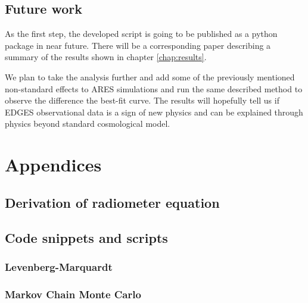 \documentclass[12pt, TexShade, letterpaper]{report}
\begin{document}
\section{Future work}
As the first step, the developed script is going to be published as a python package in near future. There will be a corresponding paper describing a summary of the results shown in chapter \ref{chap:results}.\par
We plan to take the analysis further and add some of the previously mentioned non-standard effects to ARES simulations and run the same described method to observe the difference the best-fit curve. The results will hopefully tell us if EDGES observational data is a sign of new physics and can be explained through physics beyond standard cosmological model.\par

\chapter{Appendices}
\section{Derivation of radiometer equation}
\section{Code snippets and scripts}	
\subsection{Levenberg-Marquardt}
\label{chap:appendix,sub:LM}
\subsection{Markov Chain Monte Carlo}
\label{chap:appendix,sub:MCMC}
\end{document}
